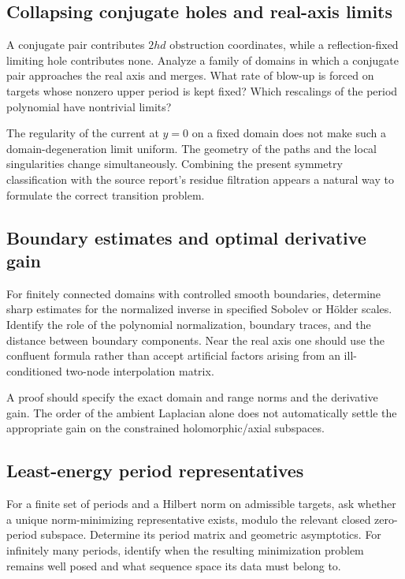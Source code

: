 \documentclass[11pt,a4paper]{article}
\numberwithin{equation}{section}
\theoremstyle{definition}
\theoremstyle{remark}
\begin{document}
\subsection{Collapsing conjugate holes and real-axis limits}

A conjugate pair contributes $2hd$ obstruction coordinates, while a
reflection-fixed limiting hole contributes none. Analyze a family of domains
in which a conjugate pair approaches the real axis and merges. What rate of
blow-up is forced on targets whose nonzero upper period is kept fixed? Which
rescalings of the period polynomial have nontrivial limits?

The regularity of the current at $y=0$ on a fixed domain does not make such a
domain-degeneration limit uniform. The geometry of the paths and the local
singularities change simultaneously. Combining the present symmetry
classification with the source report's residue filtration appears a natural
way to formulate the correct transition problem.

\subsection{Boundary estimates and optimal derivative gain}

For finitely connected domains with controlled smooth boundaries, determine
sharp estimates for the normalized inverse in specified Sobolev or H\"older
scales. Identify the role of the polynomial normalization, boundary traces,
and the distance between boundary components. Near the real axis one should
use the confluent formula rather than accept artificial factors arising from
an ill-conditioned two-node interpolation matrix.

A proof should specify the exact domain and range norms and the derivative
gain. The order of the ambient Laplacian alone does not automatically settle
the appropriate gain on the constrained holomorphic/axial subspaces.

\subsection{Least-energy period representatives}

For a finite set of periods and a Hilbert norm on admissible targets, ask
whether a unique norm-minimizing representative exists, modulo the relevant
closed zero-period subspace. Determine its period matrix and geometric
asymptotics. For infinitely many periods, identify when the resulting
minimization problem remains well posed and what sequence space its data must
belong to.
\end{document}
